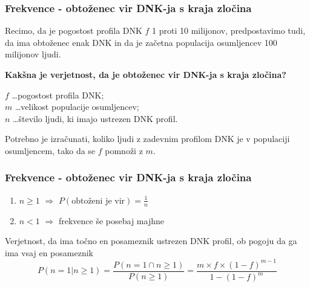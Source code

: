 \documentclass{beamer}
\begin{document}
\begin{frame}
    \frametitle{Frekvence - obtoženec vir DNK-ja s kraja zločina}
    Recimo, da je pogostost profila DNK $f$ 1 proti 10 milijonov, predpostavimo tudi, da ima obtoženec enak DNK in da je začetna populacija osumljencev 100 milijonov ljudi.
    \begin{block}{}
        \textbf{Kakšna je verjetnost, da je obtoženec vir DNK-ja s kraja zločina?}
    \end{block} \vspace{3mm}
    $f$ \dots pogostost profila DNK;\\
    $m$ \dots velikost populacije osumljencev; \\
    $n$ \dots število ljudi, ki imajo ustrezen DNK profil. \\
    \begin{block}{}
        Potrebno je izračunati, koliko ljudi z zadevnim profilom DNK je v populaciji osumljencem, tako da se $f$ pomnoži z $m$.
    \end{block} 
\end{frame}

\begin{frame}
    \frametitle{Frekvence - obtoženec vir DNK-ja s kraja zločina}
    \begin{enumerate}
        \item $n \ge 1$ $\Rightarrow$ $P(\text{obtoženi je vir})=\frac{1}{n}$
        \item $n < 1$ $\Rightarrow$ frekvence še posebaj majhne
    \end{enumerate} \vspace{3mm}
    \begin{block}{Verjetnost, da ima točno en posameznik ustrezen DNK profil, ob pogoju da ga ima vsaj en posameznik}
        \[
            P(n = 1 \lvert n \ge 1) = \frac{P(n=1 \cap n \ge 1)}{P(n \ge 1)} = \frac{m \times f \times (1 - f)^{m-1}}{1 - (1 - f)^m}
        \]
    \end{block}
\end{frame}
\end{document}
